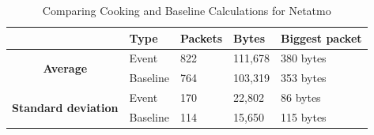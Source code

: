 \begin{table}[H]
    \centering
    \caption{Comparing Cooking and Baseline Calculations for Netatmo}
    \begin{tabular}{c|l|l|l|l|}
        \cline{2-5}
        \multicolumn{1}{l|}{}                                              & \textbf{Type} & \textbf{Packets} & \textbf{Bytes} & \textbf{Biggest packet} \\ \hline
        \multicolumn{1}{|c|}{\multirow{2}{*}{\textbf{Average}}}            & Event         & 822              & 111,678        & 380 bytes               \\ \cline{2-5} 
        \multicolumn{1}{|c|}{}                                             & Baseline      & 764              & 103,319        & 353 bytes                \\ \hline
        \multicolumn{1}{|c|}{\multirow{2}{*}{\textbf{Standard deviation}}} & Event         & 170              & 22,802         & 86 bytes                 \\ \cline{2-5} 
        \multicolumn{1}{|c|}{}                                             & Baseline      & 114              & 15,650         & 115 bytes               \\ \hline          
    \end{tabular}
    \label{tab:NetatmoComparingBaselineAndCookingCalculations}
\end{table}


